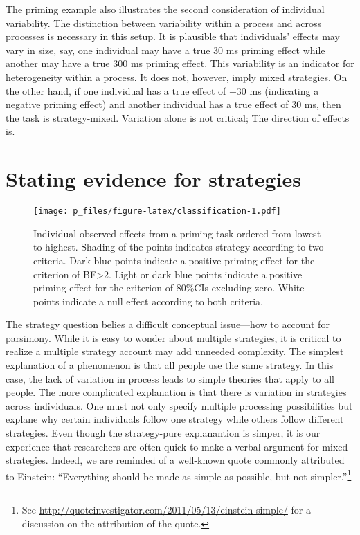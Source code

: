\documentclass[english,man]{apa6}
\theoremstyle{definition}
\theoremstyle{definition}
\theoremstyle{remark}
\begin{document}
The priming example also illustrates the second consideration of
individual variability. The distinction between variability within a
process and across processes is necessary in this setup. It is plausible
that individuals' effects may vary in size, say, one individual may have
a true \(30\) ms priming effect while another may have a true \(300\) ms
priming effect. This variability is an indicator for heterogeneity
within a process. It does not, however, imply mixed strategies. On the
other hand, if one individual has a true effect of \(-30\) ms
(indicating a negative priming effect) and another individual has a true
effect of \(30\) ms, then the task is strategy-mixed. Variation alone is
not critical; The direction of effects is.

\section{Stating evidence for
strategies}\label{stating-evidence-for-strategies}

\begin{figure}[htbp]
\centering
\texttt{[image: p\_files/figure-latex/classification-1.pdf]}
\caption{\label{fig:classification}Individual observed effects from a
priming task ordered from lowest to highest. Shading of the points
indicates strategy according to two criteria. Dark blue points indicate
a positive priming effect for the criterion of BF\textgreater{}2. Light
or dark blue points indicate a positive priming effect for the criterion
of 80\%CIs excluding zero. White points indicate a null effect according
to both criteria.}
\end{figure}

The strategy question belies a difficult conceptual issue---how to
account for parsimony. While it is easy to wonder about multiple
strategies, it is critical to realize a multiple strategy account may
add unneeded complexity. The simplest explanation of a phenomenon is
that all people use the same strategy. In this case, the lack of
variation in process leads to simple theories that apply to all people.
The more complicated explanation is that there is variation in
strategies across individuals. One must not only specify multiple
processing possibilities but explane why certain individuals follow one
strategy while others follow different strategies. Even though the
strategy-pure explanantion is simper, it is our experience that
researchers are often quick to make a verbal argument for mixed
strategies. Indeed, we are reminded of a well-known quote commonly
attributed to Einstein: \enquote{Everything should be made as simple as
possible, but not simpler.}\footnote{See
  \url{http://quoteinvestigator.com/2011/05/13/einstein-simple/} for a
  discussion on the attribution of the quote.}
\end{document}
